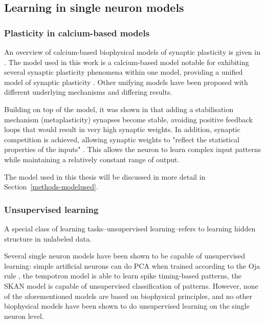 \documentclass[a4paper,12pt]{report}
\theoremstyle{definition}
\begin{document}
\subsection{Learning in single neuron models}

\subsubsection{Plasticity in calcium-based models} %
\label{subsec:cabasedmodels}
An overview of calcium-based biophysical models of synaptic plasticity is given in \cite{shouval2007models}. The model used in this work is a calcium-based model notable for exhibiting several synaptic plasticity phenomena within one model, providing a unified model of synaptic plasticity \cite{shouval2002unified}. Other unifying models have been proposed with different underlying mechanisms and differing results.

Building on top of the \cite{shouval2002unified} model, it was shown in \cite{yeung2004synaptic} that adding a stabilisation mechanism (metaplasticity) synapses become stable, avoiding positive feedback loops that would result in very high synaptic weights. In addition, synaptic competition is achieved, allowing synaptic weights to "reflect the statistical properties of the inputs" \cite{yeung2004synaptic}. This allows the neuron to learn complex input patterns while maintaining a relatively constant range of output.

The model used in this thesis will be discussed in more detail in Section~\ref{methods-modelused}.

\subsubsection{Unsupervised learning}

A special class of learning tasks--unsupervised learning--refers to learning hidden structure in unlabeled data.

Several single neuron models have been shown to be capable of unsupervised learning: simple artificial neurons can do PCA when trained according to the Oja rule \cite{oja2008oja}, the tempotron model \cite{gutig2006tempotron} is able to learn spike timing-based patterns, the SKAN model \cite{afshar2014racing} is capable of unsupervised classification of patterns. However, none of the aforementioned models are based on biophysical principles, and no other biophysical models have been shown to do unsupervised learning on the single neuron level.
\end{document}
